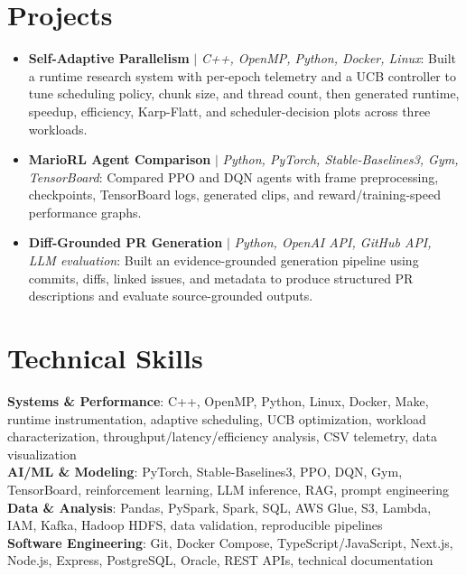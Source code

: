 \documentclass[letterpaper,11pt]{article}
\begin{document}
\section{Projects}
\begin{itemize}[leftmargin=0.15in, label={}, itemsep=1pt, topsep=1pt, parsep=0pt]
  \item\small{\textbf{Self-Adaptive Parallelism} $|$ \emph{C++, OpenMP, Python, Docker, Linux}: Built a runtime research system with per-epoch telemetry and a UCB controller to tune scheduling policy, chunk size, and thread count, then generated runtime, speedup, efficiency, Karp-Flatt, and scheduler-decision plots across three workloads.}
  \item\small{\textbf{MarioRL Agent Comparison} $|$ \emph{Python, PyTorch, Stable-Baselines3, Gym, TensorBoard}: Compared PPO and DQN agents with frame preprocessing, checkpoints, TensorBoard logs, generated clips, and reward/training-speed performance graphs.}
  \item\small{\textbf{Diff-Grounded PR Generation} $|$ \emph{Python, OpenAI API, GitHub API, LLM evaluation}: Built an evidence-grounded generation pipeline using commits, diffs, linked issues, and metadata to produce structured PR descriptions and evaluate source-grounded outputs.}
\end{itemize}\vspace{-7pt}

\section{Technical Skills}
 \begin{itemize}[leftmargin=0.15in, label={}]
    \small{\item{
     \textbf{Systems \& Performance}{: C++, OpenMP, Python, Linux, Docker, Make, runtime instrumentation, adaptive scheduling, UCB optimization, workload characterization, throughput/latency/efficiency analysis, CSV telemetry, data visualization} \\
     \textbf{AI/ML \& Modeling}{: PyTorch, Stable-Baselines3, PPO, DQN, Gym, TensorBoard, reinforcement learning, LLM inference, RAG, prompt engineering} \\
     \textbf{Data \& Analysis}{: Pandas, PySpark, Spark, SQL, AWS Glue, S3, Lambda, IAM, Kafka, Hadoop HDFS, data validation, reproducible pipelines} \\
     \textbf{Software Engineering}{: Git, Docker Compose, TypeScript/JavaScript, Next.js, Node.js, Express, PostgreSQL, Oracle, REST APIs, technical documentation}
    }}
 \end{itemize}
\end{document}
